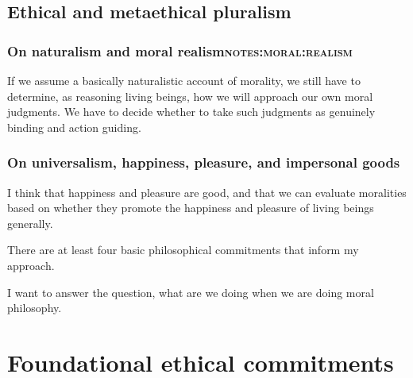 \section{Ethical and metaethical pluralism}
\label{sec:eth_plur}
\subsection{On naturalism and moral realism\hfill{}\textsc{notes:moral:realism}}
\label{sec:org8067a0d}
If we assume a basically naturalistic account of morality, we still have to
determine, as reasoning living beings, how we will approach our own moral
judgments.
We have to decide whether to take such judgments as genuinely binding and action
guiding.
\subsection{On universalism, happiness, pleasure, and impersonal goods}
\label{sec:org8fff072}
I think that happiness and pleasure are good, and that we can evaluate
moralities based on whether they promote the happiness and pleasure of living
beings generally.



There are at least four basic philosophical commitments that inform my approach.

I want to answer the question, what are we doing when we are doing moral
philosophy.
\chapter{Foundational ethical commitments}
\label{ch:eth_com}
